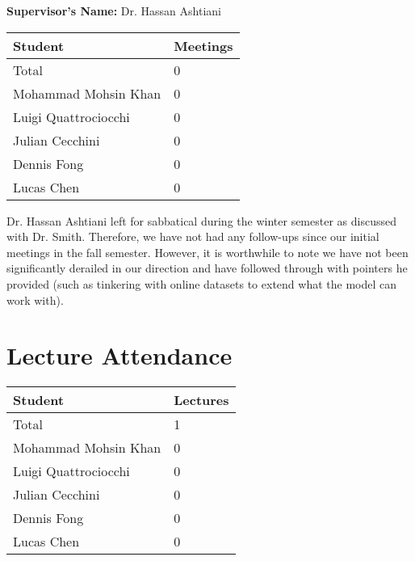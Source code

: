 \documentclass{article}
\begin{document}
\noindent \textbf{Supervisor's Name: } Dr. Hassan Ashtiani

\begin{table}[H]
\centering
\begin{tabular}{ll}
\toprule
\textbf{Student} & \textbf{Meetings}\\
\midrule
Total & 0\\
Mohammad Mohsin Khan & 0\\
Luigi Quattrociocchi & 0\\
Julian Cecchini & 0\\
Dennis Fong & 0\\
Lucas Chen & 0\\
\bottomrule
\end{tabular}
\end{table}

Dr. Hassan Ashtiani left for sabbatical during the winter semester as discussed with 
Dr. Smith. Therefore, we have not had any follow-ups since our initial meetings in the 
fall semester. However, it is worthwhile to note we have not been significantly derailed 
in our direction and have followed through with pointers he provided (such as tinkering 
with online datasets to extend what the model can work with).

\section{Lecture Attendance}


\begin{table}[H]
\centering
\begin{tabular}{ll}
\toprule
\textbf{Student} & \textbf{Lectures}\\
\midrule
Total & 1\\
Mohammad Mohsin Khan & 0\\
Luigi Quattrociocchi & 0\\
Julian Cecchini & 0\\
Dennis Fong & 0\\
Lucas Chen & 0\\
\bottomrule
\end{tabular}
\end{table}
\end{document}
